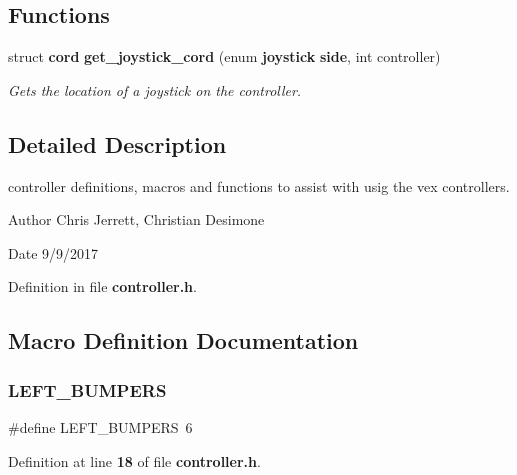 \subsection*{Functions}
\begin{DoxyCompactItemize}
\item 
struct \textbf{ cord} \textbf{ get\+\_\+joystick\+\_\+cord} (enum \textbf{ joystick} \textbf{ side}, int controller)
\begin{DoxyCompactList}\small\item\em Gets the location of a joystick on the controller. \end{DoxyCompactList}\end{DoxyCompactItemize}


\subsection{Detailed Description}
controller definitions, macros and functions to assist with usig the vex controllers. 

\begin{DoxyAuthor}{Author}
Chris Jerrett, Christian Desimone 
\end{DoxyAuthor}
\begin{DoxyDate}{Date}
9/9/2017 
\end{DoxyDate}


Definition in file \textbf{ controller.\+h}.



\subsection{Macro Definition Documentation}
\mbox{\label{controller_8h_ad61eb6d28a76985afb8d39ef925541bb}} 
\subsubsection{L\+E\+F\+T\+\_\+\+B\+U\+M\+P\+E\+RS}
{\footnotesize\ttfamily \#define L\+E\+F\+T\+\_\+\+B\+U\+M\+P\+E\+RS~6}



Definition at line \textbf{ 18} of file \textbf{ controller.\+h}.

\mbox{\label{controller_8h_a9b885de9f143efd0c862ceb054256536}} 
